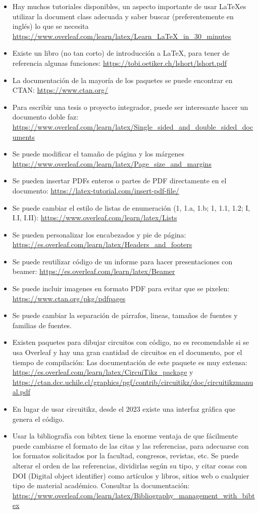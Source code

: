 \begin{itemize}
    
    \item Hay muchos tutoriales disponibles, un aspecto importante de usar \LaTeX es utilizar la document class adecuada y saber buscar (preferentemente en inglés) lo que se necesita \url{https://www.overleaf.com/learn/latex/Learn_LaTeX_in_30_minutes}
    \item Existe un libro (no tan corto) de introducción a \LaTeX, para tener de referencia algunas funciones: \url{https://tobi.oetiker.ch/lshort/lshort.pdf}
    \item La documentación de la mayoría de los paquetes se puede encontrar en CTAN: \url{https://www.ctan.org/}
    \item Para escribir una tesis o proyecto integrador, puede ser interesante hacer un documento doble faz: \url{https://www.overleaf.com/learn/latex/Single_sided_and_double_sided_documents}
    \item Se puede modificar el tamaño de página y los márgenes \url{https://www.overleaf.com/learn/latex/Page_size_and_margins}
    \item Se pueden insertar PDFs enteros o partes de PDF directamente en el documento: \url{https://latex-tutorial.com/insert-pdf-file/}
    \item Se puede cambiar el estilo de listas de enumeración (1, 1.a, 1.b; 1, 1.1, 1.2; I, I.I, I.II): \url{https://www.overleaf.com/learn/latex/Lists}
    \item Se pueden personalizar los encabezados y pie de página: \url{https://es.overleaf.com/learn/latex/Headers_and_footers}
    \item Se puede reutilizar código de un informe para hacer presentaciones con beamer: \url{https://es.overleaf.com/learn/latex/Beamer}
    \item Se puede incluir imagenes en formato PDF para evitar que se pixelen: \url{https://www.ctan.org/pkg/pdfpages}
    \item Se puede cambiar la separación de párrafos, lineas, tamaños de fuentes y familias de fuentes.
    \item Existen paquetes para dibujar circuitos con código, no es recomendable si se usa Overleaf y hay una gran cantidad de circuitos en el documento, por el tiempo de compilación: Las documentación de este paquete es muy extensa: \url{https://es.overleaf.com/learn/latex/CircuiTikz_package} y \url{https://ctan.dcc.uchile.cl/graphics/pgf/contrib/circuitikz/doc/circuitikzmanual.pdf}
    \item En lugar de usar circuitikz, desde el 2023 existe una interfaz gráfica que genera el código.
    \item Usar la bibliografía con bibtex tiene la enorme ventaja de que fácilmente puede cambiarse el formato de las citas y las referencias, para adecuarse con los formatos solicitados por la facultad, congresos, revistas, etc. Se puede alterar el orden de las referencias, dividirlas según su tipo, y citar cosas con DOI (Digital object identifier) como artículos y libros, sitios web o cualquier tipo de material académico. Consultar la documentación: \url{https://www.overleaf.com/learn/latex/Bibliography_management_with_bibtex}
\end{itemize}

